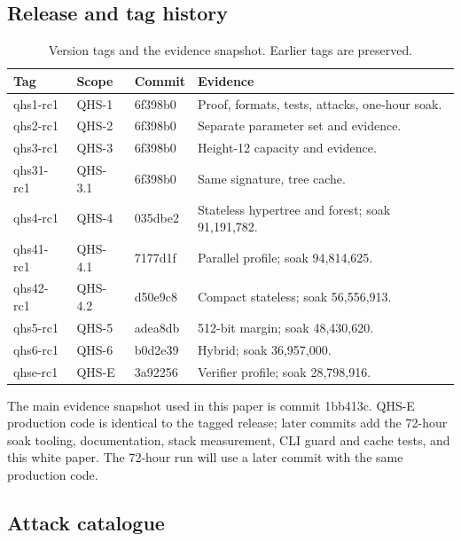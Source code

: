 \documentclass[11pt,a4paper]{article}
\begin{document}
\subsection{Release and tag history}

\begin{table}[ht]
\centering
\caption{Version tags and the evidence snapshot. Earlier tags are preserved.}
\label{tab:tags}
\footnotesize
\begin{tabularx}{\textwidth}{@{}l l l Y@{}}
\toprule
Tag & Scope & Commit & Evidence\\
\midrule
qhs1-rc1 & QHS-1 & 6f398b0 & Proof, formats, tests, attacks, one-hour soak.\\
qhs2-rc1 & QHS-2 & 6f398b0 & Separate parameter set and evidence.\\
qhs3-rc1 & QHS-3 & 6f398b0 & Height-12 capacity and evidence.\\
qhs31-rc1 & QHS-3.1 & 6f398b0 & Same signature, tree cache.\\
qhs4-rc1 & QHS-4 & 035dbe2 & Stateless hypertree and forest; soak 91,191,782.\\
qhs41-rc1 & QHS-4.1 & 7177d1f & Parallel profile; soak 94,814,625.\\
qhs42-rc1 & QHS-4.2 & d50e9c8 & Compact stateless; soak 56,556,913.\\
qhs5-rc1 & QHS-5 & adea8db & 512-bit margin; soak 48,430,620.\\
qhs6-rc1 & QHS-6 & b0d2e39 & Hybrid; soak 36,957,000.\\
qhse-rc1 & QHS-E & 3a92256 & Verifier profile; soak 28,798,916.\\
\bottomrule
\end{tabularx}
\end{table}
\FloatBarrier

The main evidence snapshot used in this paper is commit 1bb413c. QHS-E
production code is identical to the tagged release; later commits add the
72-hour soak tooling, documentation, stack measurement, CLI guard and cache
tests, and this white paper. The 72-hour run will use a later commit with the
same production code.

\clearpage
\subsection{Attack catalogue}
\end{document}
